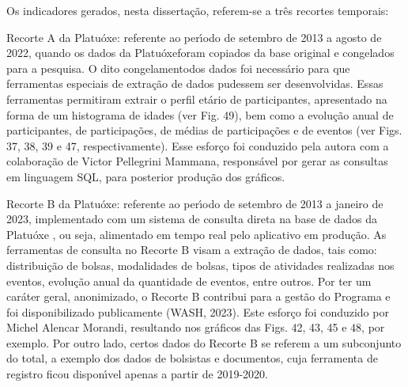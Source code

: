 \documentclass[
12pt,		%
openright,	%
twoside,  %
a4paper,			%
chapter=TITLE,		%
english,			%
french,				%
spanish,			%
brazil				%
]{USPSC-classe/USPSC}
\begin{document}
Os indicadores gerados, nesta disserta\c{c}\~ao, referem-se a tr\^es recortes temporais:


















\begin{alineas}
\item Recorte A da Platu\'oxe: referente ao per\'{\i}odo de setembro de 2013 a agosto de 2022, quando os dados da \textquotedbl Platu\'oxe\textquotedbl  foram copiados da base original e \textquotedbl congelados \textquotedbl  para a pesquisa. O dito  \textquotedbl congelamento\textquotedbl  dos dados foi necess\'ario para que ferramentas especiais de extra\c{c}\~ao de dados pudessem ser desenvolvidas. Essas ferramentas permitiram extrair o perfil et\'ario de participantes, apresentado na forma de um histograma de idades (ver Fig. 49), bem como a evolu\c{c}\~ao anual de participantes, de participa\c{c}\~oes, de m\'edias de participa\c{c}\~oes e de eventos (ver Figs. 37, 38, 39 e 47, respectivamente). Esse esfor\c{c}o foi conduzido pela autora com a colabora\c{c}\~ao de Victor Pellegrini Mammana, respons\'avel por gerar as consultas em linguagem SQL, para posterior produ\c{c}\~ao dos gr\'aficos.
\item Recorte B da Platu\'oxe: referente ao per\'{\i}odo de setembro de 2013 a janeiro de 2023, implementado com um sistema de consulta direta na base de dados da \textquotedbl Platu\'oxe \textquotedbl , ou seja, alimentado em tempo real pelo aplicativo em produ\c{c}\~ao. As ferramentas de consulta no Recorte B visam a extra\c{c}\~ao de dados, tais como: distribui\c{c}\~ao de bolsas, modalidades de bolsas, tipos de atividades realizadas nos eventos, evolu\c{c}\~ao anual da quantidade de eventos,  entre outros. Por ter um car\'ater geral, anonimizado, o Recorte B contribui para a gest\~ao do Programa e foi disponibilizado publicamente  (WASH, 2023). Este esfor\c{c}o foi conduzido por Michel Alencar Morandi, resultando nos gr\'aficos das  Figs. 42, 43, 45 e 48, por exemplo. Por outro lado, certos dados do Recorte B se referem a um subconjunto do total, a exemplo dos dados de bolsistas e documentos, cuja ferramenta de registro ficou dispon\'{\i}vel apenas a partir de 2019-2020.

\end{alineas}
\end{document}
